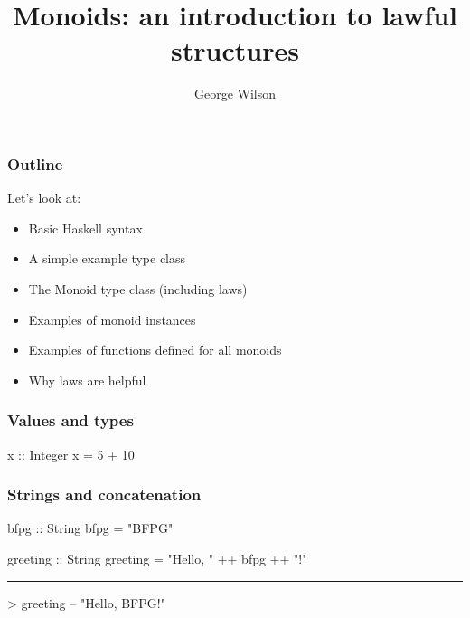 \documentclass[UKenglish,usenames,dvipsnames,svgnames,table,aspectratio=169,mathserif]{beamer}
\title[Monoids]{Monoids: an introduction to lawful structures}
\author{George Wilson}
\institute[]
{
\href{george@wils.online}{george@wils.online}
}
\date{\printdate{2026-10-13}}
\begin{document}
\begin{frame}
\titlepage
\end{frame}


\begin{frame}
\frametitle{Outline}
\begin{center}
\begin{minipage}{0.6\textwidth}
Let's look at:
\begin{itemize}
\item Basic Haskell syntax
\item A simple example type class
\item The Monoid type class (including laws)
\item Examples of monoid instances
\item Examples of functions defined for all monoids
\item Why laws are helpful
\end{itemize}
\end{minipage}
\end{center}
\end{frame}


\begin{frame}[fragile]
\frametitle{Values and types}
\begin{center}
\begin{minipage}{0.6\textwidth}
\begin{haskellcode}
x :: Integer
x = 5 + 10
\end{haskellcode}
\end{minipage}
\end{center}
\end{frame}


\begin{frame}[fragile]
\frametitle{Strings and concatenation}
\begin{center}
\begin{minipage}{0.6\textwidth}
\begin{haskellcode}
bfpg :: String
bfpg = "BFPG"

greeting :: String
greeting = "Hello, " ++ bfpg ++ "!"

\end{haskellcode}
\pause
\hrule
\begin{haskellcode}

> greeting
-- "Hello, BFPG!"
\end{haskellcode}
\end{minipage}
\end{center}
\end{frame}
\end{document}
